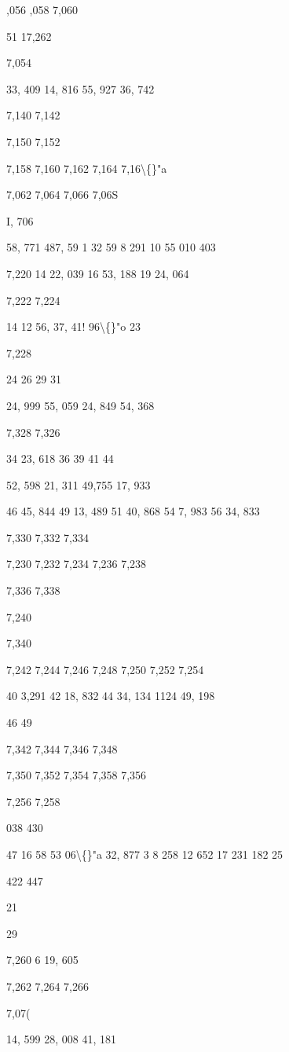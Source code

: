 \documentclass[10pt,a4paper]{article}
\begin{document}
,056
,058
7,060

51 17,262

7,054

33, 409
14, 816
55, 927
36, 742

7,140
7,142

7,150
7,152

7,158
7,160
7,162
7,164
7,16\textbackslash\{\}"a

7,062
7,064
7,066
7,06S

I, 706

58, 771
487, 59 1
32
59 8
291
10
55 010
403

7,220
14 22, 039
16 53, 188
19 24, 064

7,222
7,224

14
12 56,
37, 41!
96\textbackslash\{\}"o
23

7,228

24
26
29
31

24, 999
55, 059
24, 849
54, 368

7,328
7,326

34 23, 618
36
39
41
44

52, 598
21, 311
49,755
17, 933

46 45, 844
49 13, 489
51 40, 868
54 7, 983
56 34, 833

7,330
7,332
7,334

7,230
7,232
7,234
7,236
7,238

7,336
7,338

7,240

7,340

7,242
7,244
7,246
7,248
7,250
7,252
7,254

40 3,291
42 18, 832
44 34, 134
1124
49, 198

46
49

7,342
7,344
7,346
7,348

7,350
7,352
7,354
7,358
7,356

7,256
7,258

038
430

47
16
58
53 06\textbackslash\{\}"a
32, 877
3
8 258
12 652
17 231
182
25

422
447

21

29

7,260
6 19, 605

7,262
7,264
7,266

7,07(

14, 599
28, 008
41, 181
\end{document}
